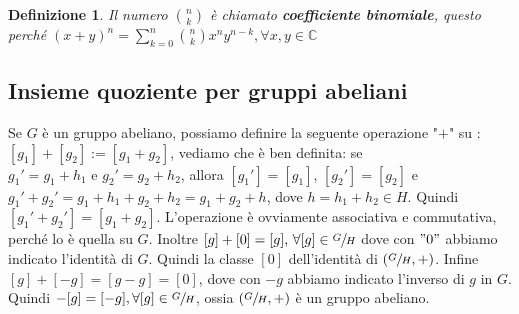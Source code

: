\documentclass[a4paper,12pt]{article}
\theoremstyle{def}
\newtheorem*{definition}{Definizione}
\theoremstyle{prop}
\theoremstyle{esempio}
\theoremstyle{dimostrazione}
\theoremstyle{teo}
\theoremstyle{osservazione}
\begin{document}
\begin{definition}
	Il numero \(\binom{n}{k}\) è chiamato \textbf{coefficiente binomiale},
	questo perché \((x+y)^n = \sum_{k=0}^{n} \binom{n}{k} x^n y^{n-k},
	\forall x,y \in \mathbb{C} \)
\end{definition}


\subsection{Insieme quoziente per gruppi abeliani}

Se \(G\) è un gruppo abeliano, possiamo definire la seguente operazione "\(+\)"
su : \([g_1] + [g_2] := [g_1 + g_2]\), vediamo che è ben definita:
se \(g_{1}' = g_1 + h_1 \text{ e } g_{2}' = g_2 + h_2\), allora \([g_{1}'] = [g_1]
\), \([g_{2}'] = [g_2]\) e \(g_{1}' + g_{2}' = g_1 + h_1 + g_2 + h_2 = g_1 + g_2 + h\),
dove \(h = h_1 + h_2 \in H\). Quindi \([g_{1}' + g_{2}'] = [g_1 + g_2]\).
L'operazione è ovviamente associativa e commutativa, perché lo è quella su \(G\).
Inoltre \([g] + [0] = [g] \text{, } \forall [g] \in \sfrac{G}{H}\) dove con \("0"\)
abbiamo indicato l'identità di \(G\). Quindi la classe \([0]\) dell'identità di \((\sfrac{G}{H} , +)
\).
Infine \([g] + [-g] = [g-g] = [0]\), dove con \(-g\) abbiamo indicato l'inverso di \(g\) in \(G\).
Quindi \(-[g] = [-g], \forall [g] \in \sfrac{G}{H}\), ossia \((\sfrac{G}{H},+)\) è un gruppo abeliano.
\end{document}
